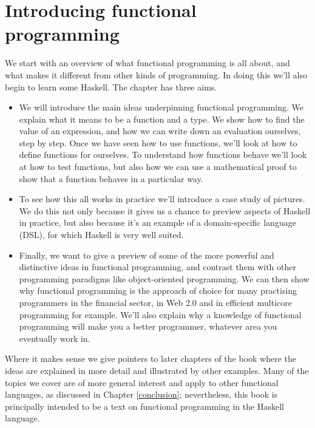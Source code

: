 %

\chapter{Introducing functional programming}
\chapstart
\label{intro}

\medskip
\noindent
We start with an overview of what functional programming is all about,
 and what makes it different from other kinds of programming. In doing this we'll also begin to learn some Haskell. The chapter has three aims.
\begin{itemize}
\item
We will introduce the main ideas underpinning functional programming.
We explain what it means to be a function and a type. We show how to 
find the value of an expression, and how we can write down an evaluation ourselves, step by step. Once we have seen how to use functions, we'll look at how to define functions for ourselves. To understand how functions behave we'll look at how to test functions, but also how we can use a mathematical proof to show that a function behaves in a particular way. 
\item
To see how this all works in practice we'll introduce a case study of pictures. We do this not only because it gives us a chance to preview aspects of Haskell in practice, but also because it's an example of a domain-specific language (DSL), for which Haskell is very well suited.  
\item 
Finally, we want to give a preview of some of the more powerful and
distinctive ideas in functional programming, and contrast them with other programming paradigms like object-oriented programming. We can then show why functional programming is the approach of choice for many practising programmers in the financial sector, in Web 2.0 and in efficient multicore programming for example. We'll also explain why a knowledge of functional programming will make you a better programmer, whatever area you eventually work in. 
\end{itemize}
Where it makes sense we
give pointers to later chapters of the book where the ideas are explained in more detail and illustrated by other examples. 
Many of the topics we cover are of more general
interest and apply to other functional languages, as discussed in
Chapter \ref{conclusion}; nevertheless, this book is principally 
intended to be a text on functional programming in the
Haskell language.

